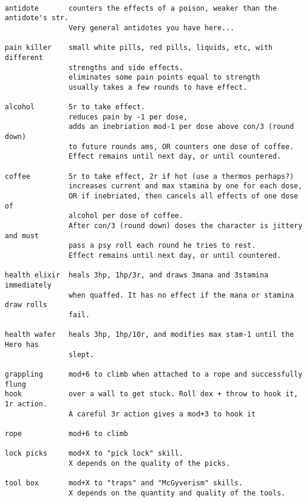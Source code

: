 \

\small
\begin{verbatim}
antidote       counters the effects of a poison, weaker than the antidote's str.
               Very general antidotes you have here...

pain killer    small white pills, red pills, liquids, etc, with different
               strengths and side effects.
               eliminates some pain points equal to strength
               usually takes a few rounds to have effect.

alcohol        5r to take effect.
               reduces pain by -1 per dose,
               adds an inebriation mod-1 per dose above con/3 (round down)
               to future rounds ams, OR counters one dose of coffee.
               Effect remains until next day, or until countered.

coffee         5r to take effect, 2r if hot (use a thermos perhaps?)
               increases current and max stamina by one for each dose,
               OR if inebriated, then cancels all effects of one dose of
               alcohol per dose of coffee.
               After con/3 (round down) doses the character is jittery and must
               pass a psy roll each round he tries to rest.
               Effect remains until next day, or until countered.

health elixir  heals 3hp, 1hp/3r, and draws 3mana and 3stamina immediately
               when quaffed. It has no effect if the mana or stamina draw rolls
               fail.

health wafer   heals 3hp, 1hp/10r, and modifies max stam-1 until the Hero has
               slept.

grappling      mod+6 to climb when attached to a rope and successfully flung
hook           over a wall to get stuck. Roll dex + throw to hook it, 1r action.
               A careful 3r action gives a mod+3 to hook it

rope           mod+6 to climb

lock picks     mod+X to "pick lock" skill.
               X depends on the quality of the picks.

tool box       mod+X to "traps" and "McGyverism" skills.
               X depends on the quantity and quality of the tools.
\end{verbatim} \goodbreak









